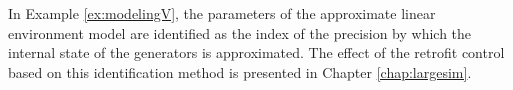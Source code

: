 \documentclass[graybox, envcountchap]{svmult}
\begin{document}
In Example \ref{ex:modelingV}, the parameters of the approximate linear
environment model are identified as the index of the precision by which the
internal state of the generators is approximated. The effect of the retrofit
control based on this identification method is presented in Chapter
\ref{chap:largesim}.

\newpage
\end{document}
